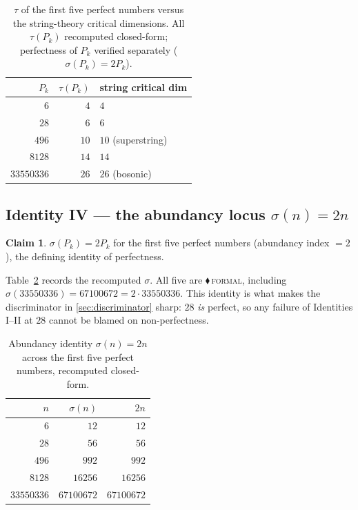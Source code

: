 \documentclass[11pt,a4paper]{article}
\newcommand{\sig}{\sigma}
\theoremstyle{definition}
\newtheorem{claim}{Claim}
\begin{document}
\begin{table}[h]
\centering
\caption{$\tau$ of the first five perfect numbers versus the string-theory
critical dimensions. All $\tau(P_k)$ recomputed closed-form; perfectness of
$P_k$ verified separately ($\sig(P_k)=2P_k$).}
\label{tab:III}
\begin{tabular}{rrl}
\toprule
$P_k$ & $\tau(P_k)$ & string critical dim\\
\midrule
$6$         & $4$  & $4$\\
$28$        & $6$  & $6$\\
$496$       & $10$ & $10$ (superstring)\\
$8128$      & $14$ & $14$\\
$33550336$  & $26$ & $26$ (bosonic)\\
\bottomrule
\end{tabular}
\end{table}

\subsection{Identity IV --- the abundancy locus \texorpdfstring{$\sig(n)=2n$}{}}
\label{sec:IV}

\begin{claim}
$\sig(P_k)=2P_k$ for the first five perfect numbers (abundancy index $=2$),
the defining identity of perfectness.
\end{claim}
\noindent Table~\ref{tab:IV} records the recomputed $\sig$. All five are
\textcolor{blue!60!black}{$\blacklozenge$}\,\textsc{formal}, including
$\sig(33550336)=67100672=2\cdot 33550336$. This identity is what makes the
discriminator in \textsection\ref{sec:discriminator} sharp: $28$ \emph{is}
perfect, so any failure of Identities I--II at $28$ cannot be blamed on
non-perfectness.

\begin{table}[h]
\centering
\caption{Abundancy identity $\sig(n)=2n$ across the first five perfect
numbers, recomputed closed-form.}
\label{tab:IV}
\begin{tabular}{rrr}
\toprule
$n$ & $\sig(n)$ & $2n$\\
\midrule
$6$         & $12$       & $12$\\
$28$        & $56$       & $56$\\
$496$       & $992$      & $992$\\
$8128$      & $16256$    & $16256$\\
$33550336$  & $67100672$ & $67100672$\\
\bottomrule
\end{tabular}
\end{table}
\end{document}
